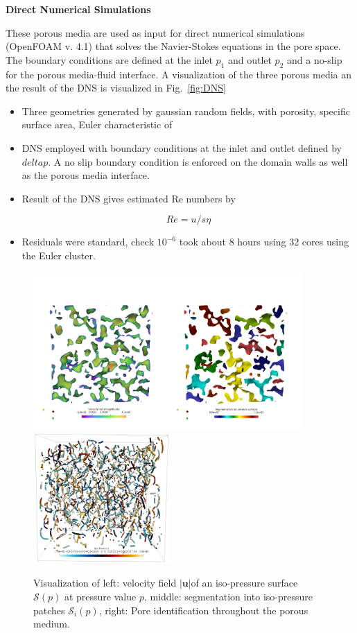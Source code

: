 \documentclass[draft,jgrga]{agutexSI2019}
\begin{document}
\begin{article}
\noindent\textbf{Direct Numerical Simulations}

These porous media are used as input for direct numerical simulations (OpenFOAM v. 4.1)   that solves the Navier-Stokes equations in the pore space. The boundary conditions are defined at the inlet $p_1$ and outlet $p_2$ and a no-slip for the porous media-fluid interface. A visualization of the three porous media an the result of the DNS is visualized in Fig.~\ref{fig:DNS}
\begin{itemize}
	\item Three geometries generated by gaussian random fields, with porosity, specific surface area, Euler characteristic of 
	\item DNS employed with boundary conditions at the inlet and outlet defined by $delta p$. A no slip boundary condition is enforced on the domain walls as well as the porous media interface. 
	\item Result of the DNS gives estimated Re numbers by 

	\begin{equation}
		Re = u/s\eta
	\end{equation}

	\item Residuals were standard, check $10^{-6}$ took about 8 hours using 32 cores using the Euler cluster. 


\end{itemize}

\begin{figure}[htbp!]\label{fig:segmentation}
\includegraphics[height=6cm]{figures/semgentation_veloctiy_iso_p_surface.png}
\includegraphics[height=5cm]{figures/pores_PM2.png}
\caption{Visualization of left: velocity field $|\mathbf{u}|$of an iso-pressure surface $\mathcal{S}(p)$ at pressure value $p$, middle: segmentation into iso-pressure patches  $\mathcal{S}_i(p)$, right: Pore identification throughout the porous medium. }
\end{figure}


\end{article}
\end{document}
